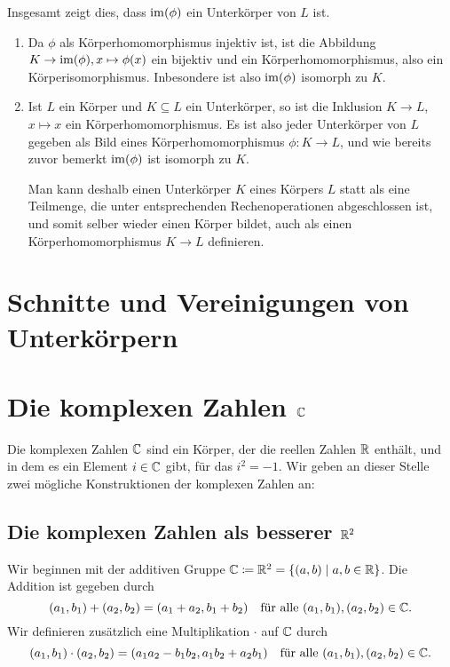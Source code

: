 Insgesamt zeigt dies, dass $\mathrm{im}(\phi)$ ein Unterkörper von $L$ ist.

\begin{bem}
 \begin{enumerate}[leftmargin=*]
  \item
   Da $\phi$ als Körperhomomorphismus injektiv ist, ist die Abbildung $K \to \mathrm{im}(\phi), x \mapsto \phi(x)$ ein bijektiv und ein Körperhomomorphismus, also ein Körperisomorphismus. Inbesondere ist also $\mathrm{im}(\phi)$ isomorph zu $K$.
  \item
   Ist $L$ ein Körper und $K \subseteq L$ ein Unterkörper, so ist die Inklusion $K \to L$, $x \mapsto x$ ein Körperhomomorphismus. Es ist also jeder Unterkörper von $L$ gegeben als Bild eines Körperhomomorphismus $\phi \colon K \to L$, und wie bereits zuvor bemerkt $\mathrm{im}(\phi)$ ist isomorph zu $K$.
   
   Man kann deshalb einen Unterkörper $K$ eines Körpers $L$ statt als eine Teilmenge, die unter entsprechenden Rechenoperationen abgeschlossen ist, und somit selber wieder einen Körper bildet, auch als einen Körperhomomorphismus $K \to L$ definieren.
 \end{enumerate}
\end{bem}





\section{Schnitte und Vereinigungen von Unterkörpern}





\section{Die komplexen Zahlen \texorpdfstring{$\mathbb{C}$}{C}}
Die komplexen Zahlen $\mathbb{C}$ sind ein Körper, der die reellen Zahlen $\mathbb{R}$ enthält, und in dem es ein Element $i \in \mathbb{C}$ gibt, für das $i^2 = -1$. Wir geben an dieser Stelle zwei mögliche Konstruktionen der komplexen Zahlen an:



\subsection{Die komplexen Zahlen als besserer \texorpdfstring{$\mathbb{R}^2$}{R2}}\label{subsec: C as R2}
Wir beginnen mit der additiven Gruppe $\mathbb{C} \coloneqq \mathbb{R}^2 = \{(a,b) \mid a,b \in \mathbb{R}\}$. Die Addition ist gegeben durch
\[
 (a_1, b_1) + (a_2, b_2) = (a_1 + a_2, b_1 + b_2)
 \quad\text{für alle $(a_1, b_1), (a_2, b_2) \in \mathbb{C}$}.
\]
Wir definieren zusätzlich eine Multiplikation $\cdot$ auf $\mathbb{C}$ durch
\[
 (a_1, b_1) \cdot (a_2, b_2)
 = (a_1 a_2 - b_1 b_2, a_1 b_2 + a_2 b_1)
 \quad\text{für alle $(a_1, b_1), (a_2, b_2) \in \mathbb{C}$}.
\]

